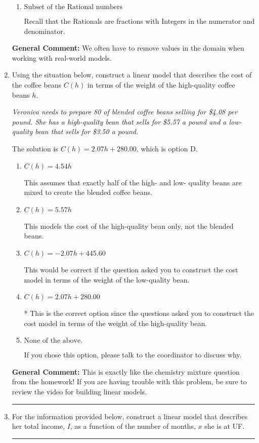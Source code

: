\documentclass{extbook}[14pt]
\newcommand{\litem}[1]{\item #1

\rule{\textwidth}{0.4pt}}
\begin{document}
\begin{enumerate}
{\begin{enumerate}[label=\Alph*.]
This means we have a domain of the Real numbers but need to throw out values based on the context.
\item \( \text{Subset of the Rational numbers} \)

Recall that the Rationals are fractions with Integers in the numerator and denominator.
\end{enumerate}

\textbf{General Comment:} We often have to remove values in the domain when working with real-world models.
}
\litem{
Using the situation below, construct a linear model that describes the cost of the coffee beans $C(h)$ in terms of the weight of the high-quality coffee beans $h$.

\begin{center}
    \textit{ Veronica needs to prepare 80 of blended coffee beans selling for \$4.08 per pound. She has a high-quality bean that sells for \$5.57 a pound and a low-quality bean that sells for \$3.50 a pound. }
\end{center}
The solution is \( C(h) = 2.07 h + 280.00 \), which is option D.\begin{enumerate}[label=\Alph*.]
\item \( C(h) = 4.54 h \)

This assumes that exactly half of the high- and low- quality beans are mixed to create the blended coffee beans.
\item \( C(h) = 5.57 h \)

This models the cost of the high-quality bean only, not the blended beans.
\item \( C(h) = -2.07 h + 445.60 \)

This would be correct if the question asked you to construct the cost model in terms of the weight of the low-quality bean.
\item \( C(h) = 2.07 h + 280.00 \)

* This is the correct option since the questions asked you to construct the cost model in terms of the weight of the high-quality bean.
\item \( \text{None of the above.} \)

If you chose this option, please talk to the coordinator to discuss why.
\end{enumerate}

\textbf{General Comment:} This is exactly like the chemistry mixture question from the homework! If you are having trouble with this problem, be sure to review the video for building linear models.
}
\litem{
For the information provided below, construct a linear model that describes her total income, $I$, as a function of the number of months, $x$ she is at UF.

}
\end{enumerate}
\end{document}
